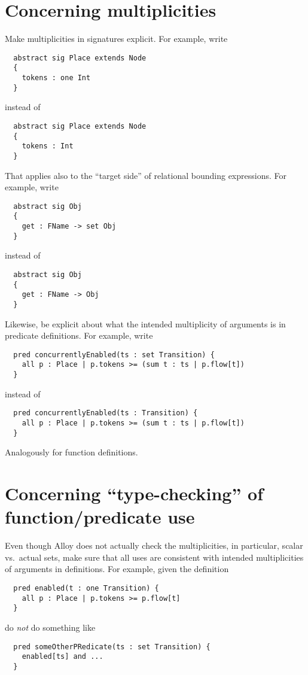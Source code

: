 \documentclass{article}
\begin{document}
\section*{Concerning multiplicities}

Make multiplicities in signatures explicit.
For example, write
\begin{lstlisting}
  abstract sig Place extends Node
  {
    tokens : one Int
  }
\end{lstlisting}
instead of
\begin{lstlisting}
  abstract sig Place extends Node
  {
    tokens : Int
  }
\end{lstlisting}
That applies also to the ``target side'' of relational bounding expressions.
For example, write
\begin{lstlisting}
  abstract sig Obj
  {
    get : FName -> set Obj
  }
\end{lstlisting}
instead of
\begin{lstlisting}
  abstract sig Obj
  {
    get : FName -> Obj
  }
\end{lstlisting}
Likewise, be explicit about what the intended multiplicity of arguments is in predicate definitions.
For example, write
\begin{lstlisting}
  pred concurrentlyEnabled(ts : set Transition) {
    all p : Place | p.tokens >= (sum t : ts | p.flow[t])
  }
\end{lstlisting}
instead of
\begin{lstlisting}
  pred concurrentlyEnabled(ts : Transition) {
    all p : Place | p.tokens >= (sum t : ts | p.flow[t])
  }
\end{lstlisting}
Analogously for function definitions.

\section*{Concerning ``type-checking'' of function/predicate use}

Even though Alloy does not actually check the multiplicities, in particular, scalar vs.\ actual sets, make sure that all uses are consistent with intended multiplicities of arguments in definitions.
For example, given the definition
\begin{lstlisting}
  pred enabled(t : one Transition) {
    all p : Place | p.tokens >= p.flow[t]
  }
\end{lstlisting}
do \emph{not} do something like
\begin{lstlisting}
  pred someOtherPRedicate(ts : set Transition) {
    enabled[ts] and ...
  }
\end{lstlisting}
\end{document}
